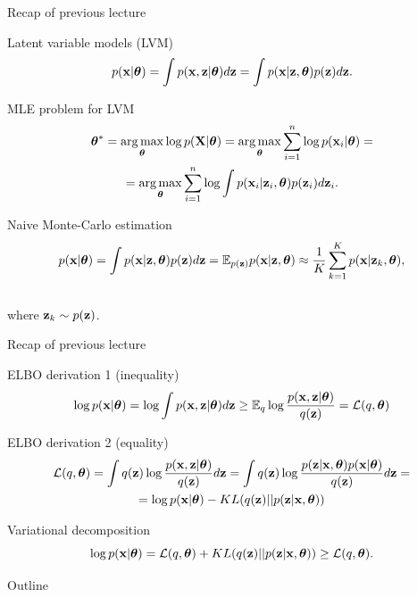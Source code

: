 	\begin{frame}{Recap of previous lecture}
		\begin{block}{Latent variable models (LVM)}
			\vspace{-0.3cm}
			\[
			p(\mathbf{x} | \boldsymbol{\theta}) = \int p(\mathbf{x}, \mathbf{z} | \boldsymbol{\theta}) d\mathbf{z} = \int p(\mathbf{x} | \mathbf{z}, \boldsymbol{\theta}) p(\mathbf{z}) d\mathbf{z}.
			\]
		\end{block}
		\begin{block}{MLE problem for LVM}
			\vspace{-0.7cm}
			\begin{multline*}
				\boldsymbol{\theta}^* = \operatorname*{arg\,max}_{\boldsymbol{\theta}} \log p(\mathbf{X}| \boldsymbol{\theta}) = \operatorname*{arg\,max}_{\boldsymbol{\theta}} \sum_{i=1}^n \log p(\mathbf{x}_i | \boldsymbol{\theta}) = \\ = \operatorname*{arg\,max}_{\boldsymbol{\theta}}  \sum_{i=1}^n \log \int p(\mathbf{x}_i| \mathbf{z}_i, \boldsymbol{\theta}) p(\mathbf{z}_i) d\mathbf{z}_i.
			\end{multline*}
			\vspace{-0.7cm}
		\end{block}
		\begin{block}{Naive Monte-Carlo estimation}
			\vspace{-0.7cm}
			\[
			p(\mathbf{x} | \boldsymbol{\theta}) = \int p(\mathbf{x} | \mathbf{z}, \boldsymbol{\theta}) p(\mathbf{z}) d\mathbf{z} = \mathbb{E}_{p(\mathbf{z})} p(\mathbf{x} | \mathbf{z}, \boldsymbol{\theta}) \approx \frac{1}{K} \sum_{k=1}^{K} p(\mathbf{x} | \mathbf{z}_k, \boldsymbol{\theta}),
			\]
			\vspace{-0.5cm} \\
			where $\mathbf{z}_k \sim p(\mathbf{z})$. 
		\end{block}
	\end{frame}
	\begin{frame}{Recap of previous lecture}
		\begin{block}{ELBO derivation 1 (inequality)}
			\vspace{-0.3cm}
			\begin{multline*}
				\log p(\mathbf{x}| \boldsymbol{\theta}) 
				= \log \int p(\mathbf{x}, \mathbf{z} | \boldsymbol{\theta}) d\mathbf{z} \geq \mathbb{E}_{q} \log \frac{p(\mathbf{x}, \mathbf{z}| \boldsymbol{\theta})}{q(\mathbf{z})} =  \mathcal{L}(q, \boldsymbol{\theta})
			\end{multline*}
			\vspace{-0.3cm}
		\end{block}
		\begin{block}{ELBO derivation 2 (equality)}
			\vspace{-0.3cm}
			\begin{multline*}
				\mathcal{L} (q, \boldsymbol{\theta}) = \int q(\mathbf{z}) \log \frac{p(\mathbf{x}, \mathbf{z} | \boldsymbol{\theta})}{q(\mathbf{z})}d\mathbf{z} = 
				\int q(\mathbf{z}) \log \frac{p(\mathbf{z}|\mathbf{x}, \boldsymbol{\theta})p(\mathbf{x}| \boldsymbol{\theta})}{q(\mathbf{z})}d\mathbf{z} = \\
				= \log p(\mathbf{x}| \boldsymbol{\theta}) - KL(q(\mathbf{z}) || p(\mathbf{z}|\mathbf{x}, \boldsymbol{\theta}))
			\end{multline*}
		\end{block}
		\vspace{-0.3cm}
		\begin{block}{Variational decomposition}
			\[
			\log p(\mathbf{x}| \boldsymbol{\theta}) = \mathcal{L} (q, \boldsymbol{\theta}) + KL(q(\mathbf{z}) || p(\mathbf{z}|\mathbf{x}, \boldsymbol{\theta})) \geq \mathcal{L} (q, \boldsymbol{\theta}).
			\]
		\end{block}
	\end{frame}
	\begin{frame}{Outline}
		\tableofcontents
	\end{frame}
